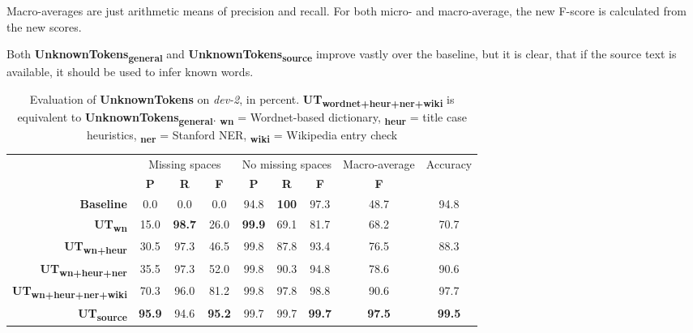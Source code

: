 \documentclass[a4paper,10pt]{scrartcl}
\theoremstyle{style}
\begin{document}
Macro-averages are just arithmetic means of precision and recall. For both micro- and macro-average, the new F-score is calculated from the new scores.

Both \textbf{UnknownTokens\textsubscript{general}} and \textbf{UnknownTokens\textsubscript{source}} improve vastly over the baseline, but it is clear, that if the source text is available, it should be used to infer known words.


\begin{table}
\begin{center}
\begin{tabular}{r|c|c|c|c|c|c|c|c|}
& \multicolumn{3}{c|}{Missing spaces} & \multicolumn{3}{c|}{No missing spaces} & Macro-average & Accuracy\\
& \textbf{P} & \textbf{R} & \textbf{F} & \textbf{P} & \textbf{R} & \textbf{F} & \textbf{F} & \\
\hline
\textbf{Baseline} & 0.0 & 0.0 & 0.0 & 94.8 & \textbf{100} & 97.3 & 48.7 & 94.8\\
\hline
\textbf{UT\textsubscript{wn}} & 15.0 & \textbf{98.7} & 26.0 & \textbf{99.9} & 69.1 & 81.7 & 68.2 & 70.7\\
\hline
\textbf{UT\textsubscript{wn+heur}} & 30.5 & 97.3 & 46.5 & 99.8 & 87.8 & 93.4 & 76.5 & 88.3\\
\hline
\textbf{UT\textsubscript{wn+heur+ner}} & 35.5 & 97.3 & 52.0 & 99.8 & 90.3 & 94.8 & 78.6 & 90.6\\
\hline
\textbf{UT\textsubscript{wn+heur+ner+wiki}} & 70.3 & 96.0 & 81.2 & 99.8 & 97.8 & 98.8 & 90.6 & 97.7\\
\hline
\textbf{UT\textsubscript{source}} & \textbf{95.9} & 94.6 & \textbf{95.2} & 99.7 & 99.7 & \textbf{99.7} & \textbf{97.5} & \textbf{99.5}\\
\end{tabular}
\end{center}
\caption{Evaluation of \textbf{UnknownTokens} on \textit{dev-2}, in percent. \textbf{UT\textsubscript{wordnet+heur+ner+wiki}} is equivalent to \textbf{UnknownTokens\textsubscript{general}}. \textbf{\textsubscript{wn}} = Wordnet-based dictionary, \textbf{\textsubscript{heur}} = title case heuristics, \textbf{\textsubscript{ner}} = Stanford NER, \textbf{\textsubscript{wiki}} = Wikipedia entry check}
\label{eval_unknowntokens}
\end{table}
\end{document}

